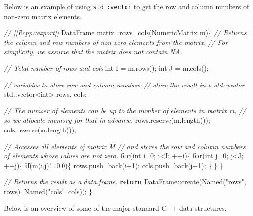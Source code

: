 \documentclass[
]{book}
\newenvironment{Shaded}{\begin{snugshade}}{\end{snugshade}}
\newcommand{\BuiltInTok}[1]{#1}
\newcommand{\CommentTok}[1]{\textcolor[rgb]{0.56,0.35,0.01}{\textit{#1}}}
\newcommand{\ControlFlowTok}[1]{\textcolor[rgb]{0.13,0.29,0.53}{\textbf{#1}}}
\newcommand{\DataTypeTok}[1]{\textcolor[rgb]{0.13,0.29,0.53}{#1}}
\newcommand{\DecValTok}[1]{\textcolor[rgb]{0.00,0.00,0.81}{#1}}
\newcommand{\FloatTok}[1]{\textcolor[rgb]{0.00,0.00,0.81}{#1}}
\newcommand{\NormalTok}[1]{#1}
\newcommand{\StringTok}[1]{\textcolor[rgb]{0.31,0.60,0.02}{#1}}
\begin{document}
Below is an example of using \texttt{std::vector} to get the row and column numbers of non-zero matrix elements.

\begin{Shaded}
\begin{Highlighting}[]
\CommentTok{// [[Rcpp::export]]}
\NormalTok{DataFrame matix_rows_cols(NumericMatrix m)\{}
    \CommentTok{// Returns the column and row numbers of non-zero elements from the matrix.}
    \CommentTok{// For simplicity, we assume that the matrix does not contain NA.}

    \CommentTok{// Tolal number of rows and cols}
    \DataTypeTok{int}\NormalTok{ I = m.rows();}
    \DataTypeTok{int}\NormalTok{ J = m.cols();}

    \CommentTok{// variables to store row and column numbers}
    \CommentTok{// store the result in a std::vector}
    \BuiltInTok{std::}\NormalTok{vector<}\DataTypeTok{int}\NormalTok{> rows, cols;}

    \CommentTok{// The number of elements can be up to the number of elements in matrix m,}
    \CommentTok{// so we allocate memory for that in advance.}
\NormalTok{    rows.reserve(m.length());}
\NormalTok{    cols.reserve(m.length());}

    \CommentTok{// Accesses all elements of matrix M}
    \CommentTok{// and stores the row and column numbers of elements whose values are not zero.}
    \ControlFlowTok{for}\NormalTok{(}\DataTypeTok{int}\NormalTok{ i=}\DecValTok{0}\NormalTok{; i<I; ++i)\{}
        \ControlFlowTok{for}\NormalTok{(}\DataTypeTok{int}\NormalTok{ j=}\DecValTok{0}\NormalTok{; j<J; ++j)\{}
            \ControlFlowTok{if}\NormalTok{(m(i,j)!=}\FloatTok{0.0}\NormalTok{)\{}
\NormalTok{                rows.push_back(i+}\DecValTok{1}\NormalTok{);}
\NormalTok{                cols.push_back(j+}\DecValTok{1}\NormalTok{);}
\NormalTok{            \}}
\NormalTok{        \}}
\NormalTok{    \}}

    \CommentTok{// Returns the result as a data.frame.}
    \ControlFlowTok{return}\NormalTok{ DataFrame::create(Named(}\StringTok{"rows"}\NormalTok{, rows),}
\NormalTok{                             Named(}\StringTok{"cols"}\NormalTok{, cols));}
\NormalTok{\}}
\end{Highlighting}
\end{Shaded}

Below is an overview of some of the major standard C++ data structures.
\end{document}
